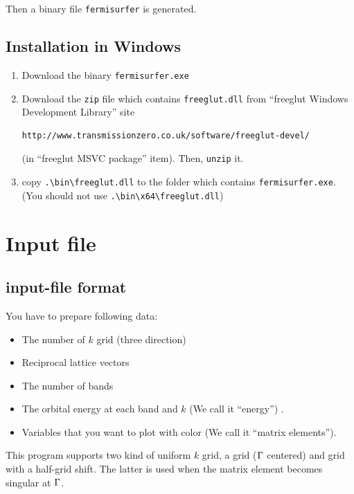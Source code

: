 \documentclass[12pt]{article}
\begin{document}
Then a binary file \texttt{fermisurfer} is generated.

\subsection{Installation in Windows}
 
\begin{enumerate}
\item Download the binary \verb|fermisurfer.exe|

\item Download the \verb|zip| file which contains \verb|freeglut.dll|
from ``freeglut Windows Development Library'' site
\begin{verbatim}
http://www.transmissionzero.co.uk/software/freeglut-devel/
\end{verbatim}
(in ``freeglut MSVC package'' item).
Then, \verb|unzip| it.

\item copy \verb|.\bin\freeglut.dll| to the folder which contains
 \verb|fermisurfer.exe|.
 (You should not use \verb|.\bin\x64\freeglut.dll|)

\end{enumerate}

\section{Input file}

\subsection{input-file format}

You have to prepare following data:
\begin{itemize}
\item The number of $k$ grid (three direction)
\item Reciprocal lattice vectors
\item The number of bands
\item The orbital energy at each band and $k$ (We call it ``energy'') .
\item Variables that you want to plot with color (We call it ``matrix elements'').
\end{itemize}

This program supports two kind of uniform $k$ grid,
a grid (${\rm \Gamma}$ centered) and grid with a half-grid shift.
The latter is used when the matrix element becomes singular 
at ${\rm \Gamma}$.
\end{document}
